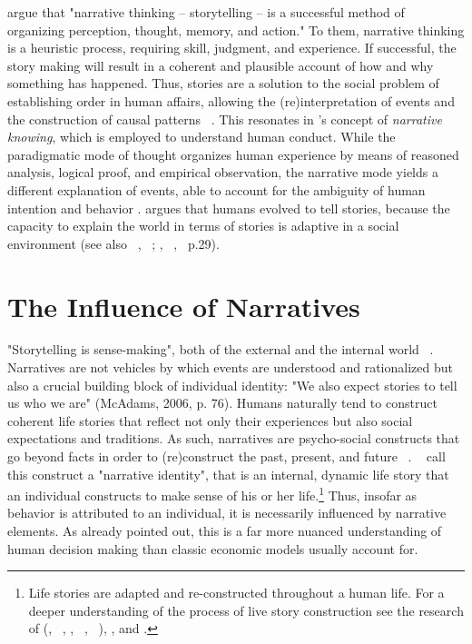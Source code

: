 \documentclass[11pt,a4paper,english,oneside]{book}
\numberwithin{equation}{chapter}
\begin{document}
\citet[pp.~123--124]{RobinsonJohnA.HawpeLinda.1986} argue that "narrative thinking -- storytelling -- is a successful method of organizing perception, thought, memory, and action." To them, narrative thinking is a heuristic process, requiring skill, judgment, and experience. If successful, the story making will result in a coherent and plausible account of how and why something has happened. Thus, stories are a solution to the social problem of establishing order in human affairs, allowing the (re)interpretation of events and the construction of causal patterns ~\cite[pp.~111--112]{RobinsonJohnA.HawpeLinda.1986}. This resonates in \citeauthor{Bruner.2000}'s \citeyearpar{Bruner.2000} concept of \textit{narrative knowing}, which is employed to understand human conduct. While the paradigmatic mode of thought  organizes human experience by means of reasoned analysis, logical proof, and empirical observation, the narrative mode yields a different explanation of events, able to account for the ambiguity of human intention and behavior \citep{Bruner.2000}. \citeauthor{Bruner.2000} argues that humans evolved to tell stories, because the capacity to explain the world in terms of stories is adaptive in a social environment (see also ~\citeauthor{McAdams.2006}, ~\citeyear{McAdams.2006}; \citeauthor{McAdams.1993}, ~\citeyear{McAdams.1993}, ~p.29).


\section{The Influence of Narratives}\label{CH:2.2} 

"Storytelling is sense-making", both of the external and the internal world ~\citep[p. 76]{McAdams.2006}. Narratives are not vehicles by which events are understood and rationalized but also a crucial building block of individual identity: "We also expect stories to tell us who
we are" (McAdams, 2006, p. 76). Humans naturally tend to construct coherent life stories that reflect not only their experiences but also social expectations and traditions.  As such, narratives are psycho-social constructs that go beyond facts in order to (re)construct the past, present, and future ~\cite[pp.~301--307]{McAdams.1996}. ~\citet[p.~81]{JackJ.Bauer.2008} call this construct a "narrative identity", that is an internal, dynamic life story that an individual constructs to make sense of his or her life.\footnote{Life stories are adapted and re-constructed throughout a human life. For a deeper understanding of the process of live story construction see the research of \citeauthor{McAdams.1985} (\citeyear{McAdams.1985}, ~\citeyear{McAdams.1996}, \citeyear{McAdams.2001}, ~\citeyear{McAdams.2006}, ~\citeyear{McAdams.}), \cite{Damasio.1999}, and \cite{Habermas.2000}.} Thus, insofar as behavior is attributed to an individual, it is necessarily influenced by narrative elements. As \citet[p. 59]{Akerlof.2016} already pointed out, this is a far more nuanced understanding of human decision making than classic economic models usually account for.
\end{document}
